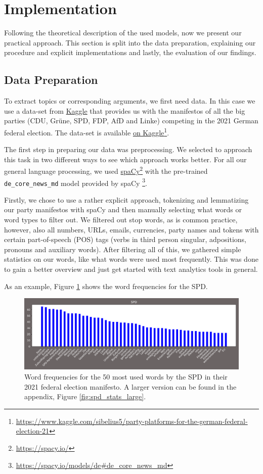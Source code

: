 \section{Implementation}\label{sec:implementation}
Following the theoretical description of the used models, now we present our practical approach. This section is split into the data preparation, explaining our procedure and explicit implementations and lastly, the evaluation of our findings.

\subsection{Data Preparation}
To extract topics or corresponding arguments, we first need data. In this case we use a data-set from \href{https://kaggle.com}{Kaggle} that provides us with the manifestos of all the big parties (CDU, Grüne, SPD, FDP, AfD and Linke) competing in the 2021 German federal election. The data-set is available \href{https://www.kaggle.com/sibelius5/party-platforms-for-the-german-federal-election-21}{on Kaggle}\footnote{\url{https://www.kaggle.com/sibelius5/party-platforms-for-the-german-federal-election-21}}.


The first step in preparing our data was preprocessing. We selected to approach this task in two different ways to see which approach works better. For all our general language processing, we used \href{https://spacy.io/}{spaCy}\footnote{\url{https://spacy.io/}} with the pre-trained \texttt{de\_core\_news\_md} model provided by spaCy \footnote{\url{https://spacy.io/models/de\#de_core_news_md}}.

Firstly, we chose to use a rather explicit approach, tokenizing and lemmatizing our party manifestos with spaCy and then manually selecting what words or word types to filter out. We filtered out stop words, as is common practice, however, also all numbers, URLs, emails, currencies, party names and tokens with certain part-of-speech (POS) tags (verbs in third person singular, adpositions, pronouns and auxiliary words). After filtering all of this, we gathered simple statistics on our words, like what words were used most frequently. This was done to gain a better overview and just get started with text analytics tools in general.

As an example, Figure \ref{fig:spd_stats} shows the word frequencies for the SPD.
 
\begin{figure}[h]
    \centering
    \includegraphics[width=\linewidth]{resources/graph_SPD.png}
    \caption{Word frequencies for the 50 most used words by the SPD in their 2021 federal election manifesto. A larger version can be found in the appendix, Figure \ref{fig:spd_stats_large}.}
    \label{fig:spd_stats}
\end{figure}


